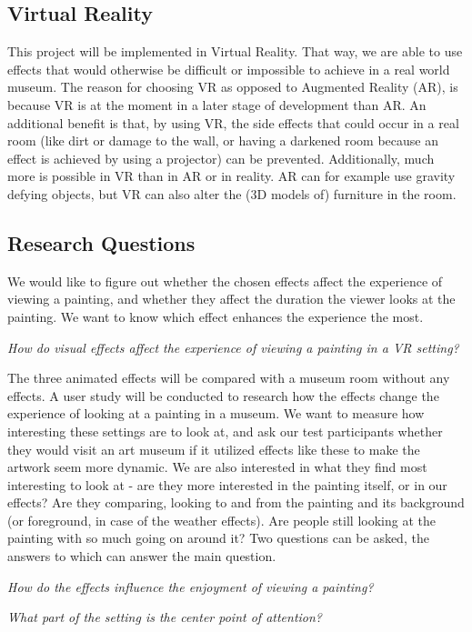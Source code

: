 \documentclass[a4paper]{article}
\begin{document}
\subsection{Virtual Reality}

This project will be implemented in Virtual Reality. That way, we are able to use effects that would otherwise be difficult or impossible to achieve in a real world museum. The reason for choosing VR as opposed to Augmented Reality (AR), is because VR is at the moment in a later stage of development than AR. An additional benefit is that, by using VR, the side effects that could occur in a real room (like dirt or damage to the wall, or having a darkened room because an effect is achieved by using a projector) can be prevented. Additionally, much more is possible in VR than in AR or in reality. AR can for example use gravity defying objects, but VR can also alter the (3D models of) furniture in the room.

\subsection {Research Questions}
We would like to figure out whether the chosen effects affect the experience of viewing a painting, and whether they affect the duration the viewer looks at the painting. We want to know which effect enhances the experience the most.

\emph{How do visual effects affect the experience of viewing a painting in a VR setting?}

The three animated effects will be compared with a museum room without any effects. A user study will be conducted to research how the effects change the experience of looking at a painting in a museum. 
We want to measure how interesting these settings are to look at, and ask our test participants whether they would visit an art museum if it utilized effects like these to make the artwork seem more dynamic. 
We are also interested in what they find most interesting to look at - are they more interested in the painting itself, or in our effects? Are they comparing, looking to and from the painting and its background (or foreground, in case of the weather effects). Are people still looking at the painting with so much going on around it? 
Two questions can be asked, the answers to which can answer the main question.

\emph{How do the effects influence the enjoyment of viewing a painting?}

\emph{What part of the setting is the center point of attention?} 
\end{document}
